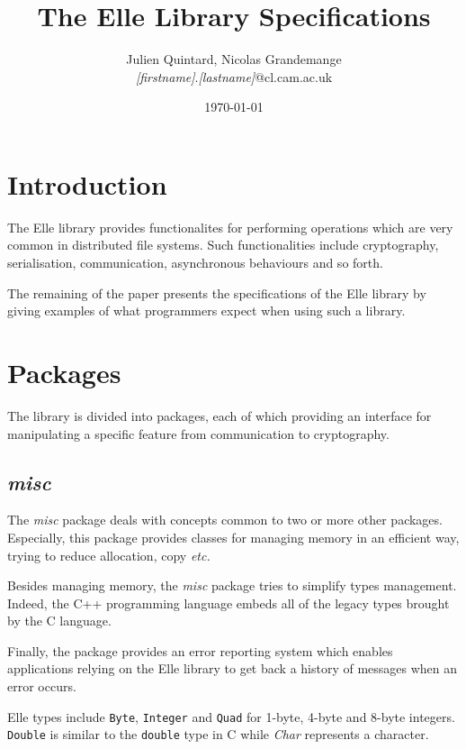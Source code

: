 \documentclass[10pt,a4wide]{article}
\title
{
  The Elle Library Specifications
  \vspace{2cm}
}
\author
{
  \small{Julien Quintard, Nicolas Grandemange} \\
  \scriptsize{\textit{[firstname]}.\textit{[lastname]}@cl.cam.ac.uk}
  \vspace{1cm}
}
\date{\scriptsize{\today}}
\newcommand\etc[0]{\textit{etc.}}
\begin{document}
\maketitle

%
%

\section{Introduction}

The Elle library provides functionalites for performing operations which
are very common in distributed file systems. Such functionalities include
cryptography, serialisation, communication, asynchronous behaviours and so
forth.

The remaining of the paper presents the specifications of the Elle library
by giving examples of what programmers expect when using such a library.

%
%

\section{Packages}

The library is divided into packages, each of which providing an interface
for manipulating a specific feature from communication to cryptography.

%
%

\subsection{\textit{misc}}

The \textit{misc} package deals with concepts common to two or more other
packages. Especially, this package provides classes for managing memory
in an efficient way, trying to reduce allocation, copy \etc{}

Besides managing memory, the \textit{misc} package tries to simplify types
management. Indeed, the C++ programming language embeds all of the legacy
types brought by the C language.

Finally, the package provides an error reporting system which enables
applications relying on the Elle library to get back a history of messages
when an error occurs.

Elle types include \texttt{Byte}, \texttt{Integer} and \texttt{Quad} for
1-byte, 4-byte and 8-byte integers. \texttt{Double} is similar to the
\texttt{double} type in C while \textit{Char} represents a character.
\end{document}

